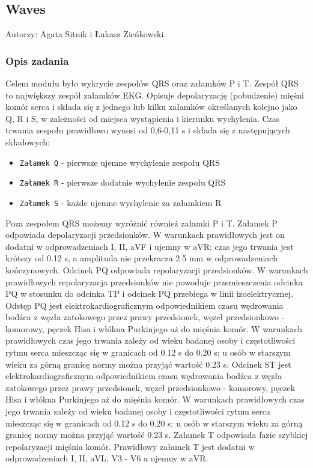 \documentclass[a4paper, 11pt]{article}
\begin{document}
\subsection{Waves}
\label{sec:waves}
Autorzy: Agata Sitnik i Łukasz Zieńkowski.

\subsubsection{Opis zadania}
\label{sec:st_interval:desc}
Celem modułu było wykrycie zespołów QRS oraz załamków P i T.
Zespół QRS to największy zespół załamków EKG. Opisuje depolaryzację (pobudzenie) mięśni komór serca i składa się z jednego lub kilku załamków określanych kolejno jako Q, R i S, w zależności od miejsca wystąpienia i kierunku wychylenia. Czas trwania zespołu prawidłowo wynosi od 0,6-0,11 s i składa się z następujących składowych:
\begin{itemize}
     \item \verb|Załamek Q| - pierwsze ujemne wychylenie zespołu QRS
     \item \verb|Załamek R| - pierwsze dodatnie wychylenie zespołu QRS
     \item \verb|Załamek S| - każde ujemne wychylenie za załamkiem R
\end{itemize}

Poza zespołem QRS możemy wyróżnić również załamki P i T.
Załamek P odpowiada depolaryzacji przedsionków. W warunkach prawidłowych jest on dodatni w odprowadzeniach I, II, aVF i ujemny w aVR; czas jego trwania jest krótszy od 0.12 s, a amplituda nie przekracza 2.5 mm w odprowadzeniach kończynowych.
Odcinek PQ odpowiada repolaryzacji przedsionków. W warunkach prawidłowych repolaryzacja przedsionków nie powoduje przemieszczenia odcinka PQ w stosunku do odcinka TP i odcinek PQ przebiega w linii izoelektrycznej.
Odstęp PQ jest elektrokardiograficznym odpowiednikiem czasu wędrowania bodźca z węzła zatokowego
przez prawy przedsionek, węzeł przedsionkowo - komorowy, pęczek Hisa i włókna Purkinjego aż do mięśnia komór. W warunkach prawidłowych czas jego trwania zależy od wieku badanej osoby i częstotliwości rytmu serca mieszcząc się w granicach od 0.12 s do 0.20 s; u osób w starszym wieku za górną granicę normy można przyjąć wartość 0.23 s.
Odcinek ST jest elektrokardiograficznym odpowiednikiem czasu wędrowania bodźca z węzła zatokowego przez prawy przedsionek, węzeł przedsionkowo - komorowy, pęczek Hisa i włókna Purkinjego aż do mięśnia komór. W warunkach prawidłowych czas jego trwania zależy od wieku badanej osoby i częstotliwości rytmu serca mieszcząc się w granicach od 0.12 s do 0.20 s; u osób w starszym wieku za górną granicę normy można przyjąć wartość 0.23 s.
Załamek T odpowiada fazie szybkiej repolaryzacji mięśnia komór. Prawidłowy załamek T jest dodatni w odprowadzeniach I, II, aVL, V3 - V6 a ujemny w aVR.
\end{document}
